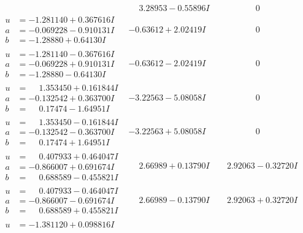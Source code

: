 \documentclass[1p]{elsarticle_modified}
\theoremstyle{definition}
\begin{document}
$$\begin{array}{c|c|c}
 & \phantom{-}3.28953 - 0.55896 I & \phantom{-0.000000 } 0 \\ \hline\begin{aligned}
u &= -1.281140 + 0.367616 I \\
a &= -0.069228 - 0.910131 I \\
b &= -1.28880 + 0.64130 I\end{aligned}
 & -0.63612 + 2.02419 I & \phantom{-0.000000 } 0 \\ \hline\begin{aligned}
u &= -1.281140 - 0.367616 I \\
a &= -0.069228 + 0.910131 I \\
b &= -1.28880 - 0.64130 I\end{aligned}
 & -0.63612 - 2.02419 I & \phantom{-0.000000 } 0 \\ \hline\begin{aligned}
u &= \phantom{-}1.353450 + 0.161844 I \\
a &= -0.132542 + 0.363700 I \\
b &= \phantom{-}0.17474 - 1.64951 I\end{aligned}
 & -3.22563 - 5.08058 I & \phantom{-0.000000 } 0 \\ \hline\begin{aligned}
u &= \phantom{-}1.353450 - 0.161844 I \\
a &= -0.132542 - 0.363700 I \\
b &= \phantom{-}0.17474 + 1.64951 I\end{aligned}
 & -3.22563 + 5.08058 I & \phantom{-0.000000 } 0 \\ \hline\begin{aligned}
u &= \phantom{-}0.407933 + 0.464047 I \\
a &= -0.866007 + 0.691674 I \\
b &= \phantom{-}0.688589 - 0.455821 I\end{aligned}
 & \phantom{-}2.66989 + 0.13790 I & \phantom{-}2.92063 - 0.32720 I \\ \hline\begin{aligned}
u &= \phantom{-}0.407933 - 0.464047 I \\
a &= -0.866007 - 0.691674 I \\
b &= \phantom{-}0.688589 + 0.455821 I\end{aligned}
 & \phantom{-}2.66989 - 0.13790 I & \phantom{-}2.92063 + 0.32720 I \\ \hline\begin{aligned}
u &= -1.381120 + 0.098816 I \\

\end{aligned}
\end{array}$$
\end{document}
